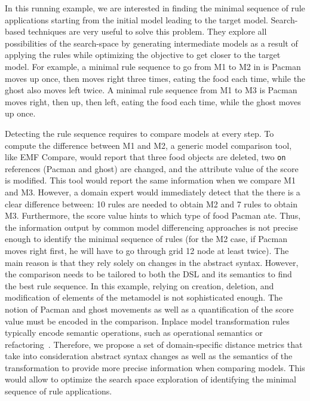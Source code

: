 In this running example, we are interested in finding the minimal sequence of rule applications starting from the initial model leading to the target model.
Search-based techniques are very useful to solve this problem.
They explore all possibilities of the search-space by generating intermediate models as a result of applying the rules while optimizing the objective to get closer to the target model.
For example, a minimal rule sequence to go from M1 to M2 in  is Pacman moves up once, then moves right three times, eating the food each time, while the ghost also moves left twice.
A minimal rule sequence from M1 to M3 is Pacman moves right, then up, then left, eating the food each time, while the ghost moves up once.

Detecting the rule sequence requires to compare models at every step.
To compute the difference between M1 and M2, a generic model comparison tool, like EMF Compare, would report that three food objects are deleted, two \texttt{on} references (Pacman and ghost) are changed, and the attribute value of the score is modified.
This tool would report the same information when we compare M1 and M3.
However, a domain expert would immediately detect that the there is a clear difference between: 10 rules are needed to obtain M2 and 7 rules to obtain M3.
Furthermore, the score value hints to which type of food Pacman ate.
Thus, the information output by common model differencing approaches is not precise enough to identify the minimal sequence of rules (\eg for the M2 case, if Pacman moves right first, he will have to go through grid 12 node at least twice).
The main reason is that they rely solely on changes in the abstract syntax.
However, the comparison needs to be tailored to both the DSL and its semantics to find the best rule sequence.
In this example, relying on creation, deletion, and modification of elements of the metamodel is not sophisticated enough.
The notion of Pacman and ghost movements as well as a quantification of the score value must be encoded in the comparison.
Inplace model transformation rules typically encode semantic operations, such as operational semantics or refactoring~\cite{Lucio2016}.
Therefore, we propose a set of domain-specific distance metrics that take into consideration abstract syntax changes as well as the semantics of the transformation to provide more precise information when comparing models. This would allow to optimize the search space exploration of identifying the minimal sequence of rule applications. 